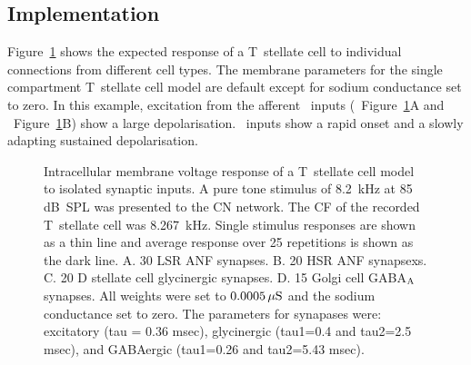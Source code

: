 \subsection{Implementation}






Figure~\ref{fig:TSinputs} shows the expected response of a T~stellate cell to
individual connections from different cell types. The membrane parameters for
the single compartment T~stellate cell model are default except for sodium
conductance set to zero. In this example, excitation from the afferent \ANF~inputs (\LSR~Figure~\ref{fig:TSinputs}A and \HSR~Figure~\ref{fig:TSinputs}B)
show a large depolarisation.  \HSR~inputs show a rapid onset and a slowly
adapting sustained depolarisation.




\begin{figure}[htb]
  \centering
  \caption[Response of T~stellate cells to isolated synaptic
  inputs]{Intracellular membrane voltage response of a T~stellate cell model to
    isolated synaptic inputs. A pure tone stimulus of 8.2~kHz at 85 dB~SPL was
    presented to the CN network. The CF of the recorded T~stellate cell was
    8.267~kHz.  Single stimulus responses are shown as a thin line and average
    response over 25 repetitions is shown as the dark line. A. 30 LSR ANF
    synapses. B. 20 HSR ANF synapsexs. C. 20 D stellate cell glycinergic
    synapses. D. 15 Golgi cell GABA$_{\rm A}$ synapses. All weights were set to
    $0.0005\,\mu{\rm S}$ and the sodium conductance set to zero.  The parameters
    for synapases were: excitatory (tau = 0.36 msec), glycinergic (tau1=0.4 and
    tau2=2.5 msec), and GABAergic (tau1=0.26 and tau2=5.43
    msec).\label{fig:TSinputs}}
\end{figure}






